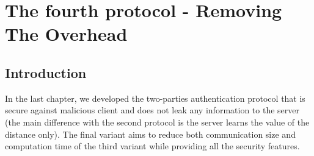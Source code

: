 \chapter{The fourth protocol - Removing The Overhead}
\label{chap:fourthProtocol}

\ifpdf
    \graphicspath{{Chapter6/Figs/Raster/}{Chapter6/Figs/PDF/}{Chapter6/Figs/}}
\else
    \graphicspath{{Chapter6/Figs/Vector/}{Chapter6/Figs/}}
\fi


\section{Introduction}
\label{sec:6intro}
In the last chapter, we developed the two-parties authentication protocol that
is secure against malicious client and does not leak any information to the
server (the main difference with the second protocol is the server learns the
value of the distance only). The final variant aims to reduce both communication
size and computation time of the third variant while providing all the security
features.
